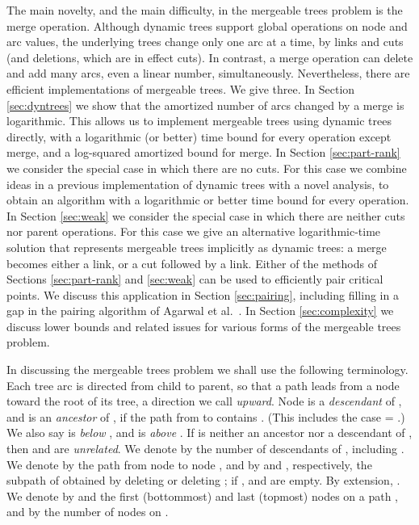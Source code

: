\documentclass[twoside,leqno,twocolumn]{article}
\begin{document}
The main novelty, and the main difficulty, in the mergeable trees problem is the merge operation.  Although dynamic trees support global operations on node and arc values, the underlying trees change only one arc at a time, by links and cuts (and deletions, which are in effect cuts).  In contrast, a merge operation can delete and add many arcs, even a linear number, simultaneously.  Nevertheless, there are efficient implementations of mergeable trees.  We give three.  In Section \ref{sec:dyntrees} we show that the amortized number of arcs changed by a merge is logarithmic.  This allows us to implement mergeable trees using dynamic trees directly, with a logarithmic (or better) time bound for every operation except merge, and a log-squared amortized bound for merge.  In Section \ref{sec:part-rank} we consider the special case in which there are no cuts.  For this case we combine ideas in a previous implementation of dynamic trees with a novel analysis, to obtain an algorithm with a logarithmic or better time bound for every operation.  In Section \ref{sec:weak} we consider the special case in which there are neither cuts nor parent operations.  For this case we give an alternative logarithmic-time solution that represents mergeable trees implicitly as dynamic trees: a merge becomes either a link, or a cut followed by a link.  Either of the methods of Sections \ref{sec:part-rank} and \ref{sec:weak} can be used to efficiently pair critical points.  We discuss this application in Section \ref{sec:pairing}, including filling in a gap in the pairing algorithm of Agarwal et al.~\cite{AEHW04,AEHW06}.  In Section \ref{sec:complexity} we discuss lower bounds and related issues for various forms of the mergeable trees problem.

In discussing the mergeable trees problem we shall use the following terminology.  Each tree arc is directed from child to parent, so that a path leads from a node toward the root of its tree, a direction we call \emph{upward}.  Node  is a \emph{descendant} of , and  is an \emph{ancestor} of , if the path from  to  contains .  (This includes the case  = .)  We also say  is \emph{below} , and  is \emph{above} .  If  is neither an ancestor nor a descendant of , then  and  are \emph{unrelated}. We denote by  the number of descendants of , including .  We denote by  the path from node  to node , and by  and , respectively, the subpath of  obtained by deleting  or deleting ; if ,  and  are empty.  By extension, .  We denote by  and  the first (bottommost) and last (topmost) nodes on a path , and by  the number of nodes on .
\end{document}
